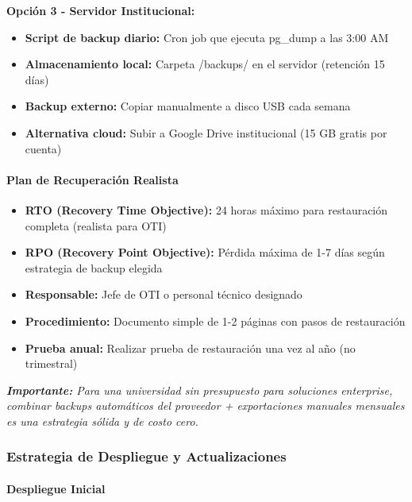\documentclass[12pt,a4paper]{article}
\begin{document}
\textbf{Opción 3 - Servidor Institucional:}
\begin{itemize}[noitemsep]
    \item \textbf{Script de backup diario:} Cron job que ejecuta pg\_dump a las 3:00 AM
    \item \textbf{Almacenamiento local:} Carpeta /backups/ en el servidor (retención 15 días)
    \item \textbf{Backup externo:} Copiar manualmente a disco USB cada semana
    \item \textbf{Alternativa cloud:} Subir a Google Drive institucional (15 GB gratis por cuenta)
\end{itemize}

\paragraph{Plan de Recuperación Realista}

\begin{itemize}[noitemsep]
    \item \textbf{RTO (Recovery Time Objective):} 24 horas máximo para restauración completa (realista para OTI)
    \item \textbf{RPO (Recovery Point Objective):} Pérdida máxima de 1-7 días según estrategia de backup elegida
    \item \textbf{Responsable:} Jefe de OTI o personal técnico designado
    \item \textbf{Procedimiento:} Documento simple de 1-2 páginas con pasos de restauración
    \item \textbf{Prueba anual:} Realizar prueba de restauración una vez al año (no trimestral)
\end{itemize}

\textit{\textbf{Importante:} Para una universidad sin presupuesto para soluciones enterprise, combinar backups automáticos del proveedor + exportaciones manuales mensuales es una estrategia sólida y de costo cero.}

\subsubsection{Estrategia de Despliegue y Actualizaciones}

\paragraph{Despliegue Inicial}
\end{document}
